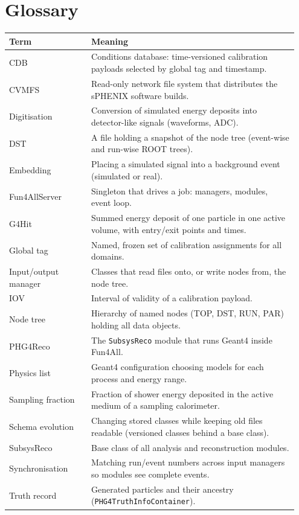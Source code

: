 \documentclass[11pt,letterpaper]{article}
\begin{document}
\section{Glossary}
\begin{longtable}{@{}p{0.27\linewidth}p{0.68\linewidth}@{}}\toprule
Term & Meaning \\\midrule\endhead
CDB & Conditions database: time-versioned calibration payloads selected by global tag and timestamp. \\
CVMFS & Read-only network file system that distributes the sPHENIX software builds. \\
Digitisation & Conversion of simulated energy deposits into detector-like signals (waveforms, ADC). \\
DST & A file holding a snapshot of the node tree (event-wise and run-wise ROOT trees). \\
Embedding & Placing a simulated signal into a background event (simulated or real). \\
Fun4AllServer & Singleton that drives a job: managers, modules, event loop. \\
G4Hit & Summed energy deposit of one particle in one active volume, with entry/exit points and times. \\
Global tag & Named, frozen set of calibration assignments for all domains. \\
Input/output manager & Classes that read files onto, or write nodes from, the node tree. \\
IOV & Interval of validity of a calibration payload. \\
Node tree & Hierarchy of named nodes (TOP, DST, RUN, PAR) holding all data objects. \\
PHG4Reco & The \texttt{SubsysReco} module that runs Geant4 inside Fun4All. \\
Physics list & Geant4 configuration choosing models for each process and energy range. \\
Sampling fraction & Fraction of shower energy deposited in the active medium of a sampling calorimeter. \\
Schema evolution & Changing stored classes while keeping old files readable (versioned classes behind a base class). \\
SubsysReco & Base class of all analysis and reconstruction modules. \\
Synchronisation & Matching run/event numbers across input managers so modules see complete events. \\
Truth record & Generated particles and their ancestry (\texttt{PHG4TruthInfoContainer}). \\\bottomrule
\end{longtable}
\end{document}
